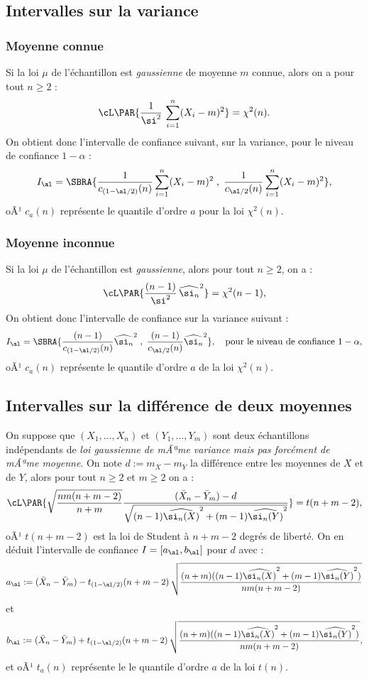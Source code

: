 \subsection{Intervalles sur la variance} 


\subsubsection{Moyenne connue} 

Si la loi $\mu$ de l'échantillon est \emph{gaussienne} de moyenne $m$ connue,
alors on a pour tout $n \geq 2$ :
$$
\cL\PAR{\frac{1}{\si^2}\,\sum_{i=1}^n (X_i-m)^2}= \chi^2 (n).
$$
On obtient donc l'intervalle de confiance suivant, sur la variance, pour le
niveau de confiance $1-\alpha$ :
$$
I_\al=\SBRA{\frac{1}{c_{(1-\al/2)}(n)}\sum_{i=1}^n (X_i-m)^2\;,\;
  \frac{1}{c_{\al/2}(n)}\sum_{i=1}^n (X_i-m)^2},
$$
oÃ¹ $c_a(n)$ représente le quantile d'ordre $a$ pour la loi $\chi^2(n)$.

\subsubsection{Moyenne inconnue} 

Si la loi $\mu$ de l'échantillon est \emph{gaussienne}, alors
pour tout $n \geq 2$, on a :
$$
\cL\PAR{\frac{(n-1)}{\si^2}\,\widehat{\si_n}^2} = \chi^2 (n-1),
$$
On obtient donc l'intervalle de confiance sur la variance suivant :
$$
I_\al=\SBRA{\frac{(n-1)}{c_{(1-\al/2)}(n)}\widehat{\si_n}^2\;,\; 
  \frac{(n-1)}{c_{\al/2}(n)}\widehat{\si_n}^2},
\text{\quad pour le niveau de confiance $1-\alpha$},
$$
oÃ¹ $c_a(n)$ représente le quantile d'ordre $a$ de la loi $\chi^2(n)$.

\subsection{Intervalles sur la différence de deux moyennes}

On suppose que $(X_1,\ldots,X_n)$ et $(Y_1,\ldots,Y_m)$ sont deux échantillons
indépendants de \emph{loi gaussienne de mÃªme variance mais pas forcément de
  mÃªme moyenne}. On note $d:=m_X-m_Y$ la différence entre les moyennes de $X$
et de $Y$, alors pour tout $n \geq 2$ et $m \geq 2$ on a :
$$ 
\cL\PAR{
\sqrt{\frac{nm(n+m-2)}{n+m}} 
\frac{(\bar{X}_n-\bar{Y}_m)-d}
{\sqrt{(n-1)\widehat{\si_n(X)}^2+(m-1)\widehat{\si_n(Y)}^2}}}
=t(n+m-2),
$$
oÃ¹ $t(n+m-2)$ est la loi de Student à $n+m-2$ degrés de liberté. On en
déduit l'intervalle de confiance $I=[a_\al,b_\al]$ pour $d$ avec :
$$
a_\al:=(\bar{X}_n-\bar{Y}_m)-t_{(1-\al/2)}(n+m-2)\,
       \sqrt{\frac{(n+m)((n-1)\widehat{\si_n(X)}^2
                     +(m-1)\widehat{\si_n(Y)}^2)}{nm(n+m-2)}}
$$
et
$$
b_\al:=(\bar{X}_n -\bar{Y}_m)+t_{(1-\al/2)}(n+m-2)\,
       \sqrt{\frac{(n+m)((n-1)\widehat{\si_n(X)}^2
                   +(m-1)\widehat{\si_n(Y)}^2)}{nm(n+m-2)}},
$$
et oÃ¹ $t_a(n)$ représente le le quantile d'ordre $a$ de la loi $t(n)$.


